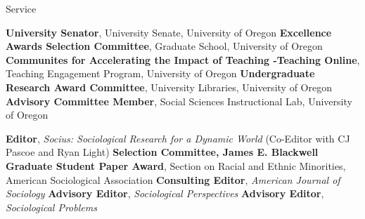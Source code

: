\begin{rubric}{Service}
\begin{itemize}
\end{itemize}
\entry*[2019 -- 2021] \textbf{University Senator}, University Senate, University of Oregon  
\entry*[2018 -- 2019] \textbf{Excellence Awards Selection Committee}, Graduate School, University of Oregon  
\entry*[2017 -- 2018] \textbf{Communites for Accelerating the Impact of Teaching -Teaching Online}, Teaching Engagement Program, University of Oregon  
\entry*[2016 -- 2020] \textbf{Undergraduate Research Award Committee}, University Libraries, University of Oregon  
\entry*[2010 -- 2011] \textbf{Advisory Committee Member}, Social Sciences Instructional Lab, University of Oregon  


\entry*[2019 -- 2024] \textbf{Editor}, \emph{Socius: Sociological Research for a Dynamic World} (Co-Editor with CJ Pascoe and Ryan Light) 
\entry*[2018 -- 2019] \textbf{Selection Committee, James E. Blackwell Graduate Student Paper Award}, Section on Racial and Ethnic Minorities, American Sociological Association  
\entry*[2014 -- 2019] \textbf{Consulting Editor}, \emph{American Journal of Sociology}  
\entry*[2012 -- 2013] \textbf{Advisory Editor}, \emph{Sociological Perspectives}  
\entry*[2011 -- 2013] \textbf{Advisory Editor}, \emph{Sociological Problems}  

\end{rubric}